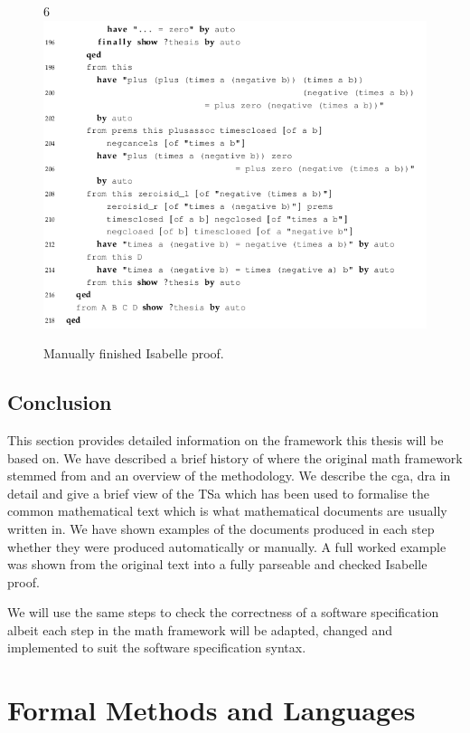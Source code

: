 \begin{figure}[H]
\begin{center}
6\includegraphics[scale=0.6]{Figures/Background/ringfull8.png}
\end{center}
\caption{Manually finished Isabelle proof. \label{fig:ringfull}}
\end{figure}

\subsection{Conclusion}

This section provides detailed information on the framework this thesis will be based on. We have described a brief history of where the original \gls{math} framework stemmed from and an overview of the methodology. We describe the \gls{cga}, \gls{dra} in detail and give a brief view of the TSa which has been used to formalise the common mathematical text which is what mathematical documents are usually written in. We have shown examples of the documents produced in each step whether they were produced automatically or manually. A full worked example was shown from the original text into a fully parseable and checked Isabelle proof.

We will use the same steps to check the correctness of a software specification albeit each step in the \gls{math} framework will be adapted, changed and implemented to suit the software specification syntax.


\section{Formal Methods and Languages}
\label{sec:formalmethodsandformallanguages}

